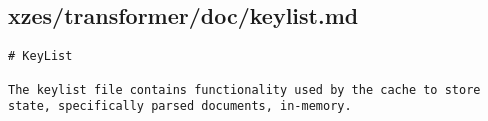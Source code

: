 \subsection{xzes/transformer/doc/keylist.md}
\begin{lstlisting}
# KeyList

The keylist file contains functionality used by the cache to store state, specifically parsed documents, in-memory.
\end{lstlisting}
